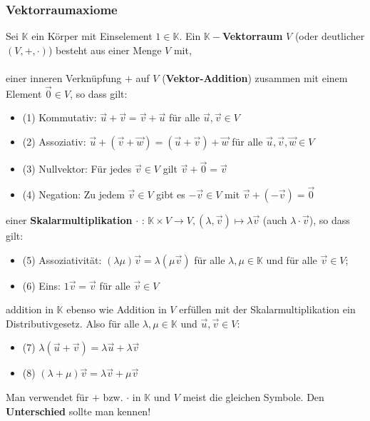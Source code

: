 \documentclass[titlepage]{article}
\newcommand{\K}{\mathbb{K}}
\newcommand{\1}{\mathbb{1}}
\newcommand{\0}{\mathbb{0}}
\begin{document}
				\subsubsection{Vektorraumaxiome}
					Sei $\K$ ein Körper mit Einselement $1\in\K$. Ein $\K-$\textbf{Vektorraum} $V$ (oder deutlicher $(V,+,\cdot)$) besteht aus einer Menge $V$ mit,
					\\\\
					einer inneren Verknüpfung $+$ auf $V$ (\textbf{Vektor-Addition}) zusammen mit einem Element $\vec{0}\in V$, so dass gilt:
					\begin{itemize}
						\item(1) Kommutativ: $\vec{u}+\vec{v}=\vec{v}+\vec{u}$ für alle $\vec{u},\vec{v}\in V$
						\item(2) Assoziativ: $\vec{u}+(\vec{v}+\vec{w})=(\vec{u}+\vec{v})+\vec{w}$ für alle $\vec{u},\vec{v},\vec{w}\in V$
						\item(3) Nullvektor: Für jedes $\vec{v}\in V$ gilt $\vec{v}+\vec{0}=\vec{v}$
						\item(4) Negation: Zu jedem $\vec{v}\in V$ gibt es $-\vec{v}\in V$ mit $\vec{v}+(-\vec{v})=\vec{0}$
					\end{itemize}
					einer \textbf{Skalarmultiplikation} $\cdot$ : $\K\times V\rightarrow V,(\lambda,\vec{v})\mapsto\lambda\vec{v}$ (auch $\lambda\cdot\vec{v}$), so dass gilt:
					\begin{itemize}
						\item(5) Assoziativität: $(\lambda\mu)\vec{v}=\lambda(\mu\vec{v})$ für alle $\lambda,\mu\in\K$ und für alle $\vec{v}\in V$;
						\item(6) Eins: $1\vec{v}=\vec{v}$ für alle $\vec{v}\in V$
					\end{itemize}
					addition in $\K$ ebenso wie Addition in $V$ erfüllen mit der Skalarmultiplikation ein Distributivgesetz. Also für alle $\lambda,\mu\in\K$ und $\vec{u},\vec{v}\in V$:
					\begin{itemize}
						\item(7) $\lambda(\vec{u}+\vec{v})=\lambda\vec{u}+\lambda\vec{v}$
						\item(8) $(\lambda+\mu)\vec{v}=\lambda\vec{v}+\mu\vec{v}$
					\end{itemize}
					Man verwendet für $+$ bzw. $\cdot$ in $\K$ und $V$ meist die gleichen Symbole. Den \textbf{Unterschied} sollte man kennen!
\end{document}
